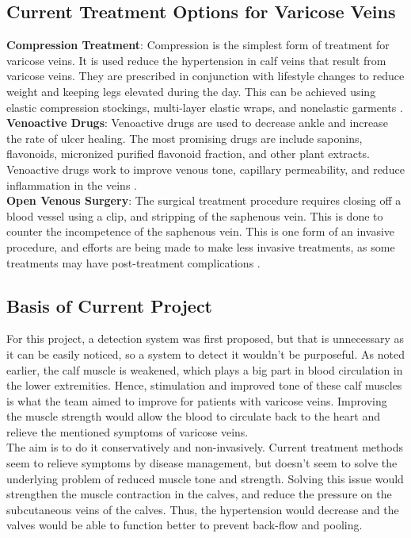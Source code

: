 \documentclass[11.5pt]{article}
\begin{document}
\subsection{Current Treatment Options for Varicose Veins} \label{treatopt}
\textbf{Compression Treatment}: Compression is the simplest form of treatment for varicose veins. It is used reduce the hypertension in calf veins that result from varicose veins. They are prescribed in conjunction with lifestyle changes to reduce weight and keeping legs elevated during the day. This can be achieved using elastic compression stockings, multi-layer elastic wraps, and nonelastic garments \cite{Treatment}.\\

\textbf{Venoactive Drugs}: Venoactive drugs are used to decrease ankle  and increase the rate of ulcer healing. The most promising drugs are include saponins, flavonoids, micronized purified flavonoid fraction, and other plant extracts. Venoactive drugs work to improve venous tone, capillary permeability, and reduce inflammation in the veins \cite{Treatment}. \\

\textbf{Open Venous Surgery}: The surgical treatment procedure requires closing off a blood vessel using a clip, and stripping of the saphenous vein. This is done to counter the incompetence of the saphenous vein. This is one form of an invasive procedure, and efforts are being made to make less invasive treatments, as some treatments may have post-treatment complications \cite{Treatment}.\\

\subsection{Basis of Current Project}
For this project, a detection system was first proposed, but that is unnecessary as it can be easily noticed, so a system to detect it wouldn't be purposeful. As noted earlier, the calf muscle is weakened, which plays a big part in blood circulation in the lower extremities. Hence, stimulation and improved tone of these calf muscles is what the team aimed to improve for patients with varicose veins. Improving the muscle strength would allow the blood to circulate back to the heart and relieve the mentioned symptoms of varicose veins.\\

The aim is to do it conservatively and non-invasively. Current treatment methods seem to relieve symptoms by disease management, but doesn't seem to solve the underlying problem of reduced muscle tone and strength. Solving this issue would strengthen the muscle contraction in the calves, and reduce the pressure on the subcutaneous veins of the calves. Thus, the hypertension would decrease and the valves would be able to function better to prevent back-flow and pooling.\\ 
\end{document}
